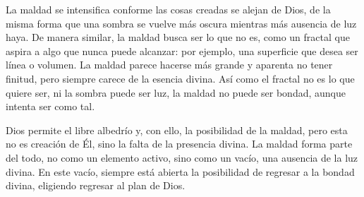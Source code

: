 \documentclass[letterpaper,13pt]{article}
\begin{document}
La maldad se intensifica conforme las cosas creadas se alejan de Dios, de la misma forma que una sombra se vuelve más oscura mientras más ausencia de luz haya. De manera similar, la maldad busca ser lo que no es, como un fractal que aspira a algo que nunca puede alcanzar: por ejemplo, una superficie que desea ser línea o volumen. La maldad parece hacerse más grande y aparenta no tener finitud, pero siempre carece de la esencia divina. Así como el fractal no es lo que quiere ser, ni la sombra puede ser luz, la maldad no puede ser bondad, aunque intenta ser como tal.

Dios permite el libre albedrío y, con ello, la posibilidad de la maldad, pero esta no es creación de Él, sino la falta de la presencia divina. La maldad forma parte del todo, no como un elemento activo, sino como un vacío, una ausencia de la luz divina. En este vacío, siempre está abierta la posibilidad de regresar a la bondad divina, eligiendo regresar al plan de Dios.
\end{document}
